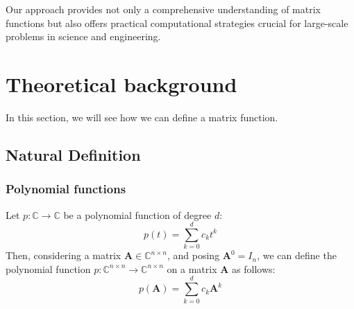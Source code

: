 \documentclass[11pt]{article}
\numberwithin{equation}{section}
\begin{document}
Our approach provides not only a comprehensive understanding of matrix functions but also offers practical computational strategies crucial for large-scale problems in science and engineering.


\section{Theoretical background}
In this section, we will see how we can define a matrix function.
\subsection{Natural Definition}
\subsubsection*{Polynomial functions}
Let $p:\mathbb{C}\rightarrow\mathbb{C}$ be a polynomial function of degree $d$:
\begin{equation}
    p(t) = \sum_{k=0}^d c_k t^k
\end{equation}
Then, considering a matrix $\mathbf{A}\in\mathbb{C}^{n\times n}$, and posing $\mathbf{A}^0 = I_n$, we can define the polynomial function $p:\mathbb{C}^{n\times n}\rightarrow\mathbb{C}^{n\times n}$ on a matrix $\mathbf{A}$ as follows:
\begin{equation}
    p(\mathbf{A}) = \sum_{k=0}^d c_k \mathbf{A}^k
\end{equation}
\end{document}
